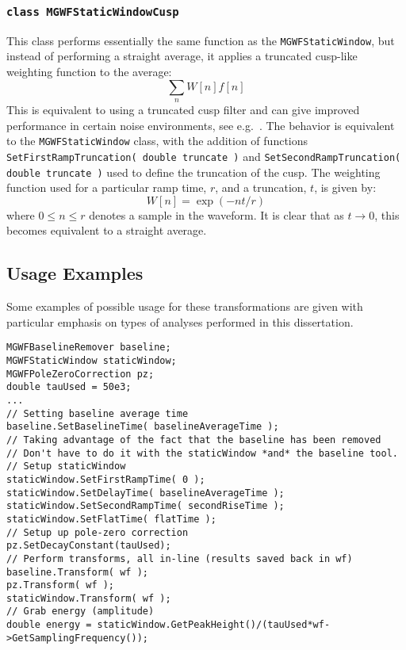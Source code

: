 			\subsubsection{\lstinline!class MGWFStaticWindowCusp!}
This class performs essentially the same function as the \lstinline!MGWFStaticWindow!, but instead of performing a straight average, it applies a truncated cusp-like weighting function to the average:  
				\[
					\sum_{n} W[n] f[n]
				\]
This is equivalent to using a truncated cusp filter and can give improved performance in certain noise environments, see e.g.~\cite{Gatti1990467}.  The behavior is equivalent to the \lstinline!MGWFStaticWindow! class, with the addition of functions \lstinline!SetFirstRampTruncation( double truncate )! and \lstinline!SetSecondRampTruncation( double truncate )! used to define the truncation of the cusp.  The weighting function used for a particular ramp time, $r$, and a truncation, $t$, is given by:
				\[
				W[n] = \exp (-n t/r)
				\]
where $0\leq n \leq r$ denotes a sample in the waveform.  It is clear that as $t \to 0$, this becomes equivalent to a straight average.
	
		\subsection{Usage Examples}
	Some examples of possible usage for these transformations are given with particular emphasis on types of analyses performed in this dissertation.  
			\begin{lstlisting}[caption=Calculating amplitude of pulse in {C$++$}]
MGWFBaselineRemover baseline;
MGWFStaticWindow staticWindow;
MGWFPoleZeroCorrection pz;
double tauUsed = 50e3;
... 
// Setting baseline average time
baseline.SetBaselineTime( baselineAverageTime );
// Taking advantage of the fact that the baseline has been removed
// Don't have to do it with the staticWindow *and* the baseline tool.
// Setup staticWindow
staticWindow.SetFirstRampTime( 0 );
staticWindow.SetDelayTime( baselineAverageTime );
staticWindow.SetSecondRampTime( secondRiseTime );
staticWindow.SetFlatTime( flatTime );
// Setup up pole-zero correction
pz.SetDecayConstant(tauUsed);
// Perform transforms, all in-line (results saved back in wf)
baseline.Transform( wf );
pz.Transform( wf );
staticWindow.Transform( wf );
// Grab energy (amplitude)
double energy = staticWindow.GetPeakHeight()/(tauUsed*wf->GetSamplingFrequency());
			\end{lstlisting}	


